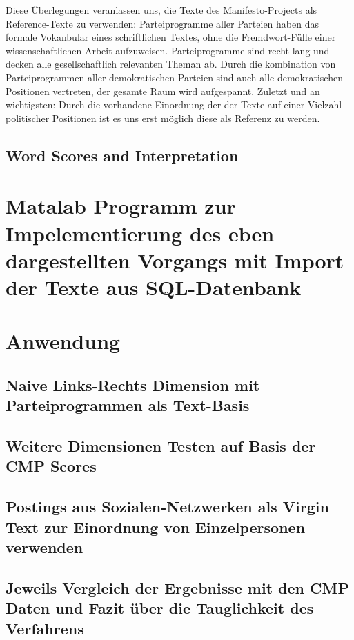   Diese Überlegungen veranlassen uns, die Texte des Manifesto-Projects als Reference-Texte zu verwenden: Parteiprogramme aller Parteien haben das formale Vokanbular eines schriftlichen Textes, ohne die Fremdwort-Fülle einer wissenschaftlichen Arbeit aufzuweisen. Parteiprogramme sind recht lang und decken alle gesellschaftlich relevanten Theman ab. Durch die kombination von Parteiprogrammen aller demokratischen Parteien sind auch alle demokratischen Positionen vertreten, der gesamte Raum wird aufgespannt. Zuletzt und an wichtigsten: Durch die vorhandene Einordnung der der Texte auf einer Vielzahl politischer Positionen ist es uns erst möglich diese als Referenz zu werden. 
  
  
  
  
  
  \subsection{Word Scores and Interpretation}
  
\section{Matalab Programm zur Impelementierung des eben dargestellten Vorgangs mit Import der Texte aus SQL-Datenbank}

\section{Anwendung}
    \subsection{Naive Links-Rechts Dimension mit Parteiprogrammen als Text-Basis}
    \subsection{Weitere Dimensionen Testen auf Basis der CMP Scores}
    \subsection{Postings aus Sozialen-Netzwerken als Virgin Text zur Einordnung von Einzelpersonen verwenden}
    \subsection{Jeweils Vergleich der Ergebnisse mit den CMP Daten und Fazit über die Tauglichkeit des Verfahrens}

